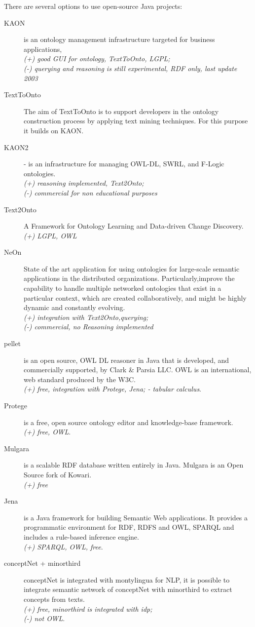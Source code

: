 \documentclass[12pt]{article}
\begin{document}
There are several options to use open-source Java projects:
\begin{description}
  \item[KAON] is an ontology management infrastructure targeted for business applications,\\
    \emph{(+) good GUI for ontology, TextToOnto, LGPL;}\\
    \emph{(-) querying and reasoning is still experimental, RDF only, last update 2003}
  \item[TextToOnto] The aim of TextToOnto is to support developers in the ontology construction process by applying text mining techniques. For this purpose it builds on KAON.
  \item[KAON2] - is an infrastructure for managing OWL-DL, SWRL, and F-Logic ontologies.\\
    \emph{(+) reasoning implemented, Text2Onto;}\\ 
    \emph{(-) commercial for non educational purposes}
  \item[Text2Onto] A Framework for Ontology Learning and Data-driven Change Discovery.\\
    \emph{(+) LGPL, OWL}
  \item[NeOn] State of the art application for using ontologies for large-scale semantic applications in the distributed organizations. Particularly,improve the capability to handle multiple networked ontologies that exist in a particular context, which are created collaboratively, and might be highly dynamic and constantly evolving.\\
    \emph{(+) integration with Text2Onto,querying;}\\ 
    \emph{(-) commercial, no Reasoning implemented}
  \item[pellet] is an open source, OWL DL reasoner in Java that is developed, and commercially supported, by Clark \& Parsia LLC. OWL is an international, web standard produced by the W3C.\\
    \emph{(+) free, integration with Protege, Jena; - tabular calculus}.
  \item[Protege] is a free, open source ontology editor and knowledge-base framework.\\
    \emph{(+) free, OWL}.
  \item[Mulgara] is a scalable RDF database written entirely in Java. Mulgara is an Open Source fork of Kowari.\\
    \emph{(+) free}
  \item[Jena] is a Java framework for building Semantic Web applications. It provides a programmatic environment for RDF, RDFS and OWL, SPARQL and includes a rule-based inference engine.\\
    \emph{(+) SPARQL, OWL, free}.
  \item[conceptNet + minorthird] conceptNet is integrated with montylingua for NLP, it is possible to integrate semantic network of conceptNet with minorthird to extract concepts from texts.\\
	\emph{(+) free, minorthird is integrated with idp;} \\
	\emph{(-) not OWL}.
\end{description}
\end{document}
